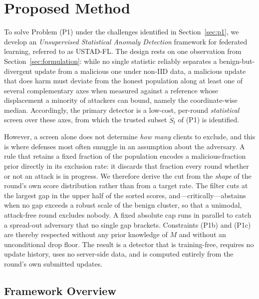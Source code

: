 \documentclass[journal]{IEEEtran}
\begin{document}
\section{Proposed Method}
\label{sec:method}

To solve Problem (P1) under the challenges identified in Section~\ref{sec:p1}, we develop an \emph{Unsupervised Statistical Anomaly Detection} framework for federated learning, referred to as USTAD-FL. The design rests on one observation from Section~\ref{sec:formulation}: while no single statistic reliably separates a benign-but-divergent update from a malicious one under non-IID data, a malicious update that does harm must deviate from the honest population along at least one of several complementary axes when measured against a reference whose displacement a minority of attackers can bound, namely the coordinate-wise median. Accordingly, the primary detector is a low-cost, per-round \emph{statistical} screen over these axes, from which the trusted subset $\widetilde{S}_t$ of (P1) is identified.

However, a screen alone does not determine \emph{how many} clients to exclude, and this is where defenses most often smuggle in an assumption about the adversary. A rule that retains a fixed fraction of the population encodes a malicious-fraction prior directly in its exclusion rate: it discards that fraction every round whether or not an attack is in progress. We therefore derive the cut from the \emph{shape} of the round's own score distribution rather than from a target rate. The filter cuts at the largest gap in the upper half of the sorted scores, and---critically---abstains when no gap exceeds a robust scale of the benign cluster, so that a unimodal, attack-free round excludes nobody. A fixed absolute cap runs in parallel to catch a spread-out adversary that no single gap brackets. Constraints (P1b) and (P1c) are thereby respected without any prior knowledge of $M$ and without an unconditional drop floor. The result is a detector that is training-free, requires no update history, uses no server-side data, and is computed entirely from the round's own submitted updates.

\subsection{Framework Overview}
\end{document}
